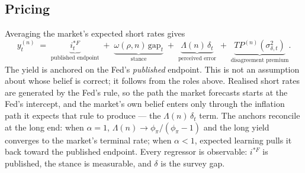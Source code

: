 \documentclass[11pt]{article}
\begin{document}
\subsection{Pricing}
Averaging the market's expected short rates gives
\begin{equation}
y^{(n)}_t \;=\; \underbrace{i^{*F}_t}_{\text{published endpoint}}
\;+\; \underbrace{\omega(\rho,n)\,\text{gap}_t}_{\text{stance}}
\;+\; \underbrace{\Lambda(n)\,\delta_t}_{\text{perceived error}}
\;+\; \underbrace{TP^{(n)}\!\left(\sigma^{2}_{\delta,t}\right)}_{\text{disagreement premium}} .
\label{eq:pricing}
\end{equation}
The yield is anchored on the Fed's \emph{published} endpoint. This is not an assumption about
whose belief is correct; it follows from the roles above. Realised short rates are generated by
the Fed's rule, so the path the market forecasts starts at the Fed's intercept, and the market's
own belief enters only through the inflation path it expects that rule to produce --- the
$\Lambda(n)\,\delta_t$ term. The anchors reconcile at the long end: when $\alpha=1$,
$\Lambda(n)\to\phi_\pi/(\phi_\pi-1)$ and the long yield converges to the market's terminal rate;
when $\alpha<1$, expected learning pulls it back toward the published endpoint. Every regressor
is observable: $i^{*F}$ is published, the stance is measurable, and $\delta$ is the survey gap.
\end{document}
